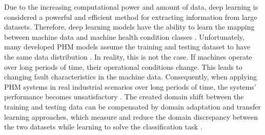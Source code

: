 Due to the increasing computational power and amount of data, deep learning is considered a powerful and efficient method for extracting information from large datasets. Therefore, deep learning models have the ability to learn the mapping between machine data and machine health condition classes \cite{ZHAO2019213}. Unfortunately, many developed PHM models assume the training and testing dataset to have the same data distribution \cite{AZAMFAR2020103932}. In reality, this is not the case. If machines operate over long periods of time, their operational conditions change. This leads to changing fault characteristics in the machine data. Consequently, when applying PHM systems in real industrial scenarios over long periods of time, the systems' performance becomes unsatisfactory \cite{AZAMFAR2020103932}. The created domain shift between the training and testing data can be compensated by domain adaptation and transfer learning approaches, which measure and reduce the domain discrepancy between the two datasets while learning to solve the classification task \cite{AZAMFAR2020103932}.


